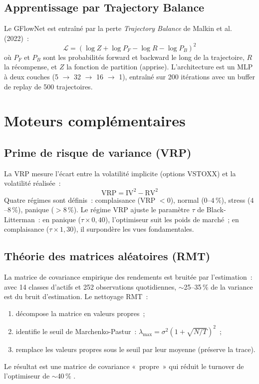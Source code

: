 \documentclass[12pt, a4paper, twoside, openright]{report}
\theoremstyle{definition}
\begin{document}
\subsection{Apprentissage par Trajectory Balance}

Le GFlowNet est entraîné par la perte \emph{Trajectory Balance} de Malkin et al. (2022)~:
$$\mathcal{L} = \left(\log Z + \log P_F - \log R - \log P_B\right)^2$$
où $P_F$ et $P_B$ sont les probabilités forward et backward le long de la trajectoire, $R$ la récompense, et $Z$ la fonction de partition (apprise). L'architecture est un MLP à deux couches (5 $\to$ 32 $\to$ 16 $\to$ 1), entraîné sur 200 itérations avec un buffer de replay de 500 trajectoires.

\section{Moteurs complémentaires}
\label{sec:gouv:complementaires}

\subsection{Prime de risque de variance (VRP)}

La VRP mesure l'écart entre la volatilité implicite (options VSTOXX) et la volatilité réalisée~:
$$\text{VRP} = \text{IV}^2 - \text{RV}^2$$
Quatre régimes sont définis~: complaisance (VRP $< 0$), normal ($0$--$4\,\%$), stress ($4$--$8\,\%$), panique ($> 8\,\%$). Le régime VRP ajuste le paramètre $\tau$ de Black-Litterman~: en panique ($\tau \times 0{,}40$), l'optimiseur suit les poids de marché~; en complaisance ($\tau \times 1{,}30$), il surpondère les vues fondamentales.

\subsection{Théorie des matrices aléatoires (RMT)}

La matrice de covariance empirique des rendements est bruitée par l'estimation~: avec 14 classes d'actifs et 252 observations quotidiennes, $\sim$25--35\,\% de la variance est du bruit d'estimation. Le nettoyage RMT~:
\begin{enumerate}[nosep]
  \item décompose la matrice en valeurs propres~;
  \item identifie le seuil de Marchenko-Pastur~: $\lambda_{\max} = \sigma^2(1 + \sqrt{N/T})^2$~;
  \item remplace les valeurs propres sous le seuil par leur moyenne (préserve la trace).
\end{enumerate}
Le résultat est une matrice de covariance «~propre~» qui réduit le turnover de l'optimiseur de $\sim$40\,\% \citep{ledoit_wolf2004}.
\end{document}
